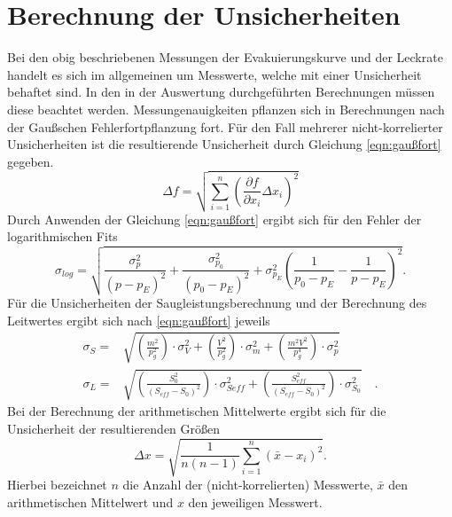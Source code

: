 \section{Berechnung der Unsicherheiten}
\label{sec:unsicherheiten}
Bei den obig beschriebenen Messungen der Evakuierungskurve und der Leckrate handelt es sich
im allgemeinen um Messwerte, welche mit einer Unsicherheit behaftet sind. In den in der
Auswertung durchgeführten Berechnungen müssen diese beachtet werden. Messungenauigkeiten
pflanzen sich in Berechnungen nach der Gaußschen Fehlerfortpflanzung fort. Für den Fall mehrerer
nicht-korrelierter Unsicherheiten ist die resultierende Unsicherheit durch Gleichung \ref{eqn:gaußfort}
gegeben.
\begin{equation}
  \Delta f = \sqrt{\sum_{i=1}^{n} \left( \frac{\partial f}{\partial x_{i}} \Delta x_{i} \right)^{2}}
 \label{eqn:gaußfort}
\end{equation}
Durch Anwenden der Gleichung \ref{eqn:gaußfort} ergibt sich für den Fehler der logarithmischen Fits
\begin{equation*}
  \sigma_{log} = \sqrt{\frac{\sigma_p^2}{(p-p_E)^2}+\frac{\sigma_{p_{0}}^2}{(p_0-p_E)^2}+\sigma_{p_E}^2 \left(\frac{1}{p_0-p_E}-\frac{1}{p-p_E}\right)^2}.
\end{equation*}
Für die Unsicherheiten der Saugleistungsberechnung und der Berechnung des Leitwertes ergibt sich nach
\ref{eqn:gaußfort} jeweils
\begin{align*}
  \sigma_{S} = & \sqrt{\left(\frac{m^2}{p_g^2}\right) \cdot \sigma_{V}^2 + \left(\frac{V^2}{p_g^2}\right) \cdot \sigma_m^2 + \left(\frac{m^2 V^2}{p_g^4}\right) \cdot \sigma_p^2} \\
  \sigma_{L} = & \sqrt{\left( \frac{ S_0^2}{(S_{eff}- S_0)^2} \right) \cdot \sigma_{Seff}^2 + \left( \frac{S_{eff}^2}{(S_{eff}- S_0)^2} \right) \cdot \sigma_{S_{0}}^2} \quad.
\end{align*}
Bei der Berechnung der arithmetischen Mittelwerte ergibt sich für die Unsicherheit der resultierenden
Größen
\begin{equation}
 \Delta x = \sqrt{\frac{1}{n(n-1)} \sum_{i=1}^{n} (\bar{x} - x_{i})^{2}}.
\end{equation}
Hierbei bezeichnet $n$ die Anzahl der (nicht-korrelierten) Messwerte, $\bar{x}$ den arithmetischen Mittelwert
und $x$ den jeweiligen Messwert.
